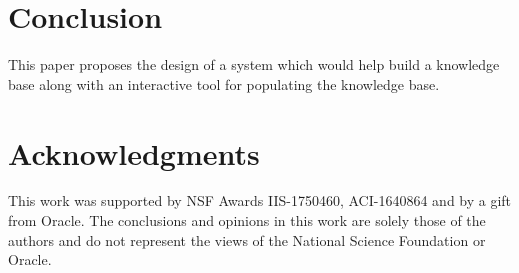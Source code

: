 \documentclass{vldb}
\begin{document}
\section{Conclusion}
This paper proposes the design of a system which would help build a knowledge base along with an interactive tool for populating the knowledge base. 



\balance

\section{Acknowledgments}
This work was supported by NSF Awards IIS-1750460, ACI-1640864
and by a gift from Oracle. The conclusions and opinions in this
work are solely those of the authors and do not represent the views
of the National Science Foundation or Oracle.




\end{document}

